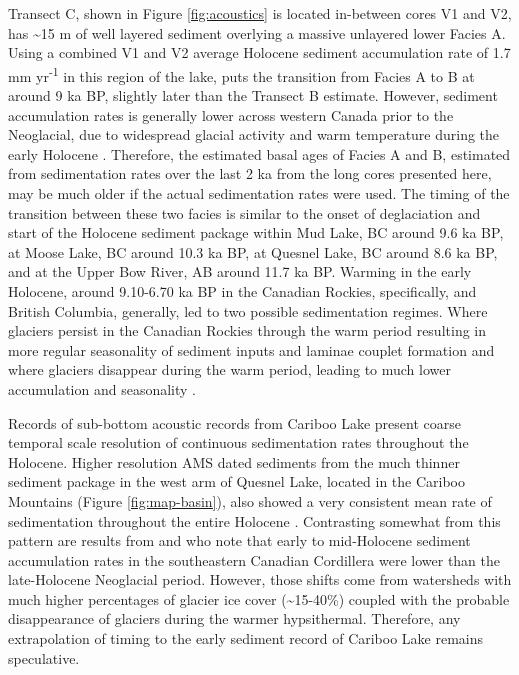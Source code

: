 \documentclass[Royal,times,doublespace,sageh]{sagej}
\begin{document}
Transect C, shown in Figure \ref{fig:acoustics} is located in-between
cores V1 and V2, has \textasciitilde15 m of well layered sediment
overlying a massive unlayered lower Facies A. Using a combined V1 and V2
average Holocene sediment accumulation rate of 1.7 mm
yr\textsuperscript{-1} in this region of the lake, puts the transition
from Facies A to B at around 9 ka BP, slightly later than the Transect B
estimate. However, sediment accumulation rates is generally lower across
western Canada prior to the Neoglacial, due to widespread glacial
activity and warm temperature during the early Holocene
\citep{Steinman2019, Menounos2004, Koch2007a, Osborn2007, Luckman1988, Luckman1993}.
Therefore, the estimated basal ages of Facies A and B, estimated from
sedimentation rates over the last 2 ka from the long cores presented
here, may be much older if the actual sedimentation rates were used. The
timing of the transition between these two facies is similar to the
onset of deglaciation and start of the Holocene sediment package within
Mud Lake, BC \citep{Hodder2006b} around 9.6 ka BP, at Moose Lake, BC
\citep{Desloges1999} around 10.3 ka BP, at Quesnel Lake, BC
\citep{Gilbert2012} around 8.6 ka BP, and at the Upper Bow River, AB
\citep{Leonard1999} around 11.7 ka BP. Warming in the early Holocene,
around 9.10-6.70 ka BP in the Canadian Rockies, specifically,
\citep{Luckman1986} and British Columbia, generally,
\citep{Clague1989, Steinman2019} led to two possible sedimentation
regimes. Where glaciers persist in the Canadian Rockies through the warm
period resulting in more regular seasonality of sediment inputs and
laminae couplet formation \citep[e.g.~Mud Lake,][]{Hodder2006b} and
where glaciers disappear during the warm period, leading to much lower
accumulation and seasonality \citep[e.g.~Moose Lake,][]{Desloges1999}.

Records of sub-bottom acoustic records from Cariboo Lake present coarse
temporal scale resolution of continuous sedimentation rates throughout
the Holocene. Higher resolution AMS dated sediments from the much
thinner sediment package in the west arm of Quesnel Lake, located in the
Cariboo Mountains (Figure \ref{fig:map-basin}), also showed a very
consistent mean rate of sedimentation throughout the entire Holocene
\citep{Gilbert2012}. Contrasting somewhat from this pattern are results
from \citet{Menounos2004} and \citet{Desloges1999} who note that early
to mid-Holocene sediment accumulation rates in the southeastern Canadian
Cordillera were lower than the late-Holocene Neoglacial period. However,
those shifts come from watersheds with much higher percentages of
glacier ice cover (\textasciitilde15-40\%) coupled with the probable
disappearance of glaciers during the warmer hypsithermal. Therefore, any
extrapolation of timing to the early sediment record of Cariboo Lake
remains speculative.
\end{document}
